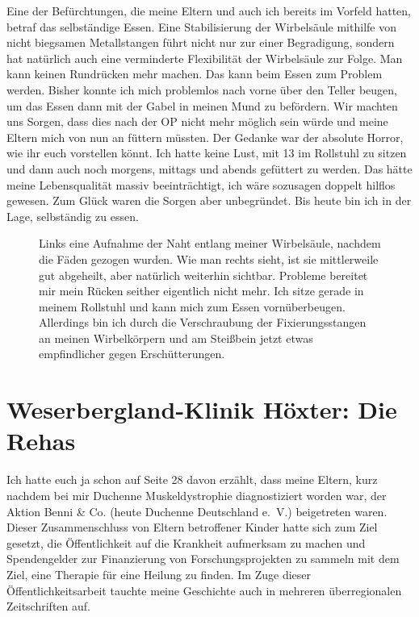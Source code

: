 \documentclass[fontsize=14pt,a4paper,headinclude,DIV=calc,automark]{scrbook}
\begin{document}
Eine der Befürchtungen, die meine Eltern und auch ich bereits im Vorfeld hatten, betraf das selbständige Essen. Eine Stabilisierung der Wirbelsäule mithilfe von nicht biegsamen Metallstangen führt nicht nur zur einer Begradigung, sondern hat natürlich auch eine verminderte Flexibilität der Wirbelsäule zur Folge. Man kann keinen Rundrücken mehr machen. Das kann beim Essen zum Problem werden. Bisher konnte ich mich problemlos nach vorne über den Teller beugen, um das Essen dann mit der Gabel in meinen Mund zu befördern. Wir machten uns Sorgen, dass dies nach der OP nicht mehr möglich sein würde und meine Eltern mich von nun an füttern müssten. Der Gedanke war der absolute Horror, wie ihr euch vorstellen könnt. Ich hatte keine Lust, mit 13 im Rollstuhl zu sitzen und dann auch noch morgens, mittags und abends gefüttert zu werden. Das hätte meine Lebensqualität massiv beeinträchtigt, ich wäre sozusagen doppelt hilflos gewesen. Zum Glück waren die Sorgen aber unbegründet. Bis heute bin ich in der Lage, selbständig zu essen.

\setlength{\fboxsep}{0pt}    %
\setlength{\fboxrule}{0.2pt} %
\begin{figure}[H]
    \centering
    \caption{Links eine Aufnahme der Naht entlang meiner Wirbelsäule, nachdem die Fäden gezogen wurden. Wie man rechts sieht, ist sie mittlerweile gut abgeheilt, aber natürlich weiterhin sichtbar. Probleme bereitet mir mein Rücken seither eigentlich nicht mehr. Ich sitze gerade in meinem Rollstuhl und kann mich zum Essen vornüberbeugen. Allerdings bin ich durch die Verschraubung der Fixierungsstangen an meinen Wirbelkörpern und am Steißbein jetzt etwas empfindlicher gegen Erschütterungen.}
    \label{fig:skoliose-op-naht}
\end{figure}

\section{Weserbergland-Klinik Höxter: Die Rehas}

Ich hatte euch ja schon auf Seite 28 davon erzählt, dass meine Eltern, kurz nachdem bei mir Duchenne Muskeldystrophie diagnostiziert worden war, der Aktion Benni \& Co. (heute Duchenne Deutschland e.~V.) beigetreten waren. Dieser Zusammenschluss von Eltern betroffener Kinder hatte sich zum Ziel gesetzt, die Öffentlichkeit auf die Krankheit aufmerksam zu machen und Spendengelder zur Finanzierung von Forschungsprojekten zu sammeln mit dem Ziel, eine Therapie für eine Heilung zu finden. Im Zuge dieser Öffentlichkeitsarbeit tauchte meine Geschichte auch in mehreren überregionalen Zeitschriften auf.
\end{document}
